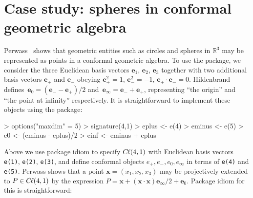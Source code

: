 \documentclass{birkjour}
\theoremstyle{definition}
\theoremstyle{remark}
\numberwithin{equation}{section}
\newcommand{\cl}{C \kern -0.1em \ell}  %
\newcommand{\einf}{\mathbf{e}_\infty}
\newcommand{\ezero}{\mathbf{e}_0}
\newcommand{\bx}{\mathbf{x}}
\renewenvironment{Schunk}{\vspace{20pt}}{\vspace{20pt}}
\begin{document}
\section{Case study: spheres in conformal geometric algebra}

{
Perwass~\cite{perwass2009} shows that geometric entities such as
circles and spheres in $\mathbb{R}^3$ may be represented as points in
a conformal geometric algebra.  To use the package, we consider the
three Euclidean basis vectors $\mathbf{e}_1$, $\mathbf{e}_2$,
$\mathbf{e}_3$ together with two additional basis vectors
$\mathbf{e}_+$ and $\mathbf{e}_-$ obeying $\mathbf{e}_+^2=1$,
$\mathbf{e}_-^2=-1$, $\mathbf{e}_+\cdot\mathbf{e}_-=0$.
Hildenbrand~\cite{hildenbrand2013}
defines~$\ezero=\left(\mathbf{e}_--\mathbf{e}_+\right)/2$
and~$\einf=\mathbf{e}_- +\mathbf{e}_+$, representing ``the origin''
and ``the point at infinity'' respectively.  It is straightforward to
implement these objects using the package:}
\begin{Schunk}
\begin{Sinput}
> options("maxdim" = 5)
> signature(4,1)
> eplus <- e(4)
> eminus <- e(5)
> e0 <- (eminus - eplus)/2
> einf <- eminus + eplus
\end{Sinput}
\end{Schunk}
%
{
Above we use package idiom to specify $\cl(4,1)$ with Euclidean basis
vectors {\tt e(1)}, {\tt e(2)}, {\tt e(3)}, and define conformal
objects $e_+, e_-, e_0,e_\infty$ in terms of {\tt e(4)} and {\tt
  e(5)}.  Perwass shows that a point $\bx=(x_1,x_2,x_3)$ may be
projectively extended to $P\in\cl(4,1)$ by the expression $P =
\bx+(\bx\cdot\bx)\einf/2 +\ezero$.  Package idiom for this is
straightforward:}
\end{document}
